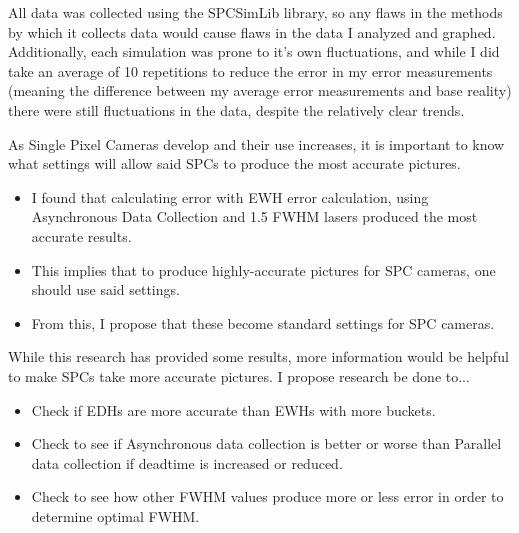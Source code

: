 \documentclass[aspectratio=169]{beamer}
\begin{document}
\begin{frame}
  All data was collected using the SPCSimLib library, so any flaws in the methods by which it collects data would cause flaws in the data I analyzed and graphed. Additionally, each simulation was prone to it's own fluctuations, and while I did take an average of 10 repetitions to reduce the error in my error measurements (meaning the difference between my average error measurements and base reality) there were still fluctuations in the data, despite the relatively clear trends.
\end{frame}

\begin{frame}
\end{frame}

\begin{frame}
   As Single Pixel Cameras develop and their use increases, it is important to know what settings will allow said SPCs to produce the most accurate pictures.
   \begin{itemize}
     \color{Blue}
  \item I found that calculating error with EWH error calculation, using Asynchronous Data Collection and 1.5 FWHM lasers produced the most accurate results.
  \item This implies that to produce highly-accurate pictures for SPC cameras, one should use said settings.
  \item From this, I propose that these become standard settings for SPC cameras.
  \end{itemize}
\end{frame}

\begin{frame}
\end{frame}

\begin{frame}
   While this research has provided some results, more information would be helpful to make SPCs take more accurate pictures. I propose research be done to...
   \begin{itemize}
     \color{Blue}
  \item Check if EDHs are more accurate than EWHs with more buckets.
  \item Check to see if Asynchronous data collection is better or worse than Parallel data collection if deadtime is increased or reduced.
  \item Check to see how other FWHM values produce more or less error in order to determine optimal FWHM.
  \end{itemize}
\end{frame}

\begin{frame}
\end{frame}

\begin{frame}
  \color{Blue}
  \printbibliography
  
\end{frame}

\begin{frame}
\end{frame}
\end{document}
